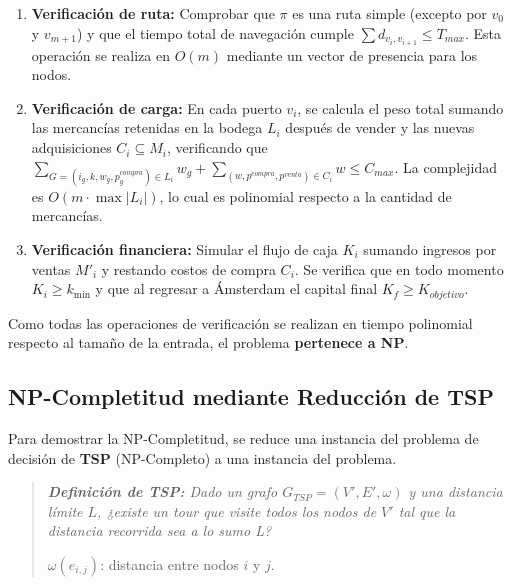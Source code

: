 \documentclass[12pt, a4paper]{article}
\begin{document}
\begin{enumerate}
    \item \textbf{Verificación de ruta:} Comprobar que $\pi$ es una ruta simple (excepto por $v_0$ y $v_{m+1}$) y que el tiempo total de navegación cumple $\sum d_{v_i, v_{i+1}} \leq T_{max}$. Esta operación se realiza en $O(m)$ mediante un vector de presencia para los nodos.
    \item \textbf{Verificación de carga:} En cada puerto $v_i$, se calcula el peso total sumando las mercancías retenidas en la bodega $L_i$ después de vender y las nuevas adquisiciones $C_i \subseteq M_i$, verificando que $\sum_{G = (i_g, k, w_g, p_g^{compra}) \in L_i} w_g + \sum_{(w,p^{compra},p^{venta}) \in C_i} w \leq C_{max}$. La complejidad es $O(m \cdot \max|L_i|)$, lo cual es polinomial respecto a la cantidad de mercancías.
    \item \textbf{Verificación financiera:} Simular el flujo de caja $K_i$ sumando ingresos por ventas $M'_i$ y restando costos de compra $C_i$. Se verifica que en todo momento $K_i \geq k_{\min}$ y que al regresar a Ámsterdam el capital final $K_f \geq K_{objetivo}$.
\end{enumerate}

Como todas las operaciones de verificación se realizan en tiempo polinomial respecto al tamaño de la entrada, el problema \textbf{pertenece a NP}.

\subsection{NP-Completitud mediante Reducción de TSP}
Para demostrar la NP-Completitud, se reduce una instancia del problema de decisión de \textbf{TSP} (NP-Completo) a una instancia del problema.

\begin{quote}
    \textit{\textbf{Definición de TSP:} Dado un grafo $G_{TSP}=(V', E', \omega)$ y una distancia límite $L$, ¿existe un tour que visite todos los nodos de $V'$ tal que la distancia recorrida sea a lo sumo L?}

    $\omega(e_{i,j})$: distancia entre nodos $i$ y $j$.
\end{quote}
\end{document}
